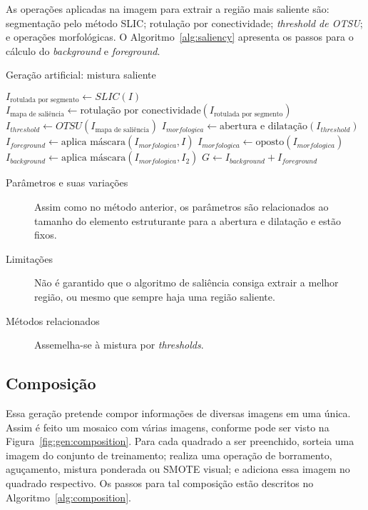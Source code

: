 As operações aplicadas na imagem para extrair a região mais saliente são: segmentação pelo método SLIC; rotulação por conectividade; \textit{threshold de OTSU}; e operações morfológicas. O Algoritmo~\ref{alg:saliency} apresenta os passos para o cálculo do \textit{background} e \textit{foreground}.

\begin{algorithm}[!htbp]
  \caption{Geração artificial: mistura saliente}
  \label{alg:saliency}
  \SetAlgoLined

  $I_{\text{rotulada por segmento}} \gets SLIC(I)$\;
  $I_{\text{mapa de saliência}} \gets \text{rotulação por conectividade}(I_{\text{rotulada por segmento}})$\;
  $I_{threshold} \gets OTSU(I_{\text{mapa de saliência}})$\;
  $I_{morfologica} \gets \text{abertura e dilatação} (I_{threshold})$\;
  $I_{foreground} \gets \text{aplica máscara}(I_{morfologica}, I) $\;
  $I_{morfologica} \gets \text{oposto}(I_{morfologica})$\;
  $I_{background} \gets \text{aplica máscara}(I_{morfologica}, I_2) $\;
  $G \gets I_{background} + I_{foreground}$\;
\end{algorithm}

\begin{description}
  \item[Parâmetros e suas variações] Assim como no método anterior, os parâmetros são relacionados ao tamanho do elemento estruturante para a abertura e dilatação e estão fixos.

  \item[Limitações] Não é garantido que o algoritmo de saliência consiga extrair
  a melhor região, ou mesmo que sempre haja uma região saliente.

  \item[Métodos relacionados] Assemelha-se à mistura por \textit{thresholds}.
\end{description}
\FloatBarrier
\subsection{Composição}

Essa geração pretende compor informações de diversas imagens em uma única. Assim é feito um mosaico com várias imagens, conforme pode ser visto na  Figura~\ref{fig:gen:composition}. Para cada quadrado a ser preenchido, sorteia uma imagem do conjunto de treinamento; realiza uma operação de borramento, aguçamento, mistura ponderada ou SMOTE visual; e adiciona essa imagem no quadrado respectivo. Os passos para tal composição estão descritos no Algoritmo~\ref{alg:composition}.

